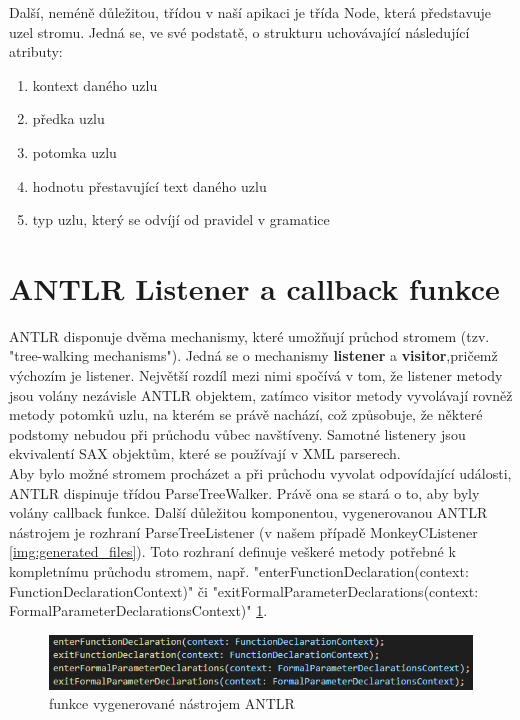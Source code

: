 

Další, neméně důležitou, třídou v naší apikaci je třída Node, která představuje uzel stromu. Jedná se, ve své podstatě, o strukturu uchovávající následující atributy:\\
\begin{enumerate}
	\item kontext daného uzlu
	\item předka uzlu
	\item potomka uzlu
	\item hodnotu přestavující text daného uzlu
	\item typ uzlu, který se odvíjí od pravidel v gramatice
\end{enumerate}




\section{ANTLR Listener a callback funkce}
ANTLR disponuje dvěma mechanismy, které umožňují průchod stromem (tzv. "tree-walking mechanisms"). Jedná se o mechanismy \textbf{listener} a \textbf{visitor},pričemž výchozím je listener. Největší rozdíl mezi nimi spočívá v tom, že listener metody jsou volány nezávisle ANTLR objektem, zatímco visitor metody vyvolávají rovněž metody potomků uzlu, na kterém se právě nachází, což způsobuje, že některé podstomy nebudou při průchodu vůbec navštíveny. Samotné listenery jsou ekvivalentí SAX objektům, které se používají v XML parserech.\\
Aby bylo možné stromem procházet a při průchodu vyvolat odpovídající události, ANTLR dispinuje třídou ParseTreeWalker. Právě ona se stará o to, aby byly volány callback funkce. Další důležitou komponentou, vygenerovanou ANTLR nástrojem je rozhraní ParseTreeListener (v našem případě MonkeyCListener \ref{img:generated_files}). Toto rozhraní definuje veškeré metody potřebné k kompletnímu průchodu stromem, např. "enterFunctionDeclaration(context: FunctionDeclarationContext)" či "exitFormalParameterDeclarations(context: FormalParameterDeclarationsContext)" \ref{img:listener_functions}. 

\begin{figure}[tbh!]
	\centering
	\includegraphics[scale=1]{images/listener_functions}
	\caption{funkce vygenerované nástrojem ANTLR} 			    
	\label{img:listener_functions}
\end{figure}

